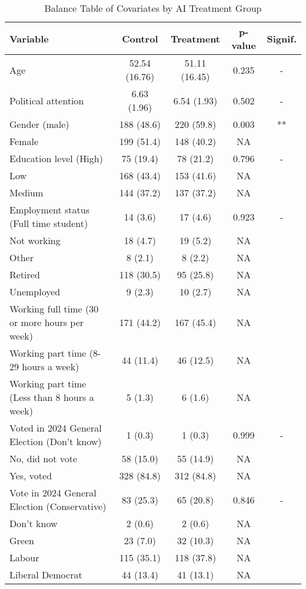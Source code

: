 \begin{table}
\centering
\caption{Balance Table of Covariates by AI Treatment Group}
\centering
\fontsize{10}{12}\selectfont
\begin{threeparttable}
\begin{tabular}[t]{lcccc}
\toprule
Variable & Control & Treatment & p-value & Signif.\\
\midrule
Age & 52.54 (16.76) & 51.11 (16.45) & 0.235 & -\\
Political attention & 6.63 (1.96) & 6.54 (1.93) & 0.502 & -\\
Gender (male) & 188 (48.6) & 220 (59.8) & 0.003 & **\\
Female & 199 (51.4) & 148 (40.2) & NA & \\
Education level (High) & 75 (19.4) & 78 (21.2) & 0.796 & -\\
\addlinespace
Low & 168 (43.4) & 153 (41.6) & NA & \\
Medium & 144 (37.2) & 137 (37.2) & NA & \\
Employment status (Full time student) & 14 (3.6) & 17 (4.6) & 0.923 & -\\
Not working & 18 (4.7) & 19 (5.2) & NA & \\
Other & 8 (2.1) & 8 (2.2) & NA & \\
\addlinespace
Retired & 118 (30.5) & 95 (25.8) & NA & \\
Unemployed & 9 (2.3) & 10 (2.7) & NA & \\
Working full time (30 or more hours per week) & 171 (44.2) & 167 (45.4) & NA & \\
Working part time (8-29 hours a week) & 44 (11.4) & 46 (12.5) & NA & \\
Working part time (Less than 8 hours a week) & 5 (1.3) & 6 (1.6) & NA & \\
\addlinespace
Voted in 2024 General Election (Don't know) & 1 (0.3) & 1 (0.3) & 0.999 & -\\
No, did not vote & 58 (15.0) & 55 (14.9) & NA & \\
Yes, voted & 328 (84.8) & 312 (84.8) & NA & \\
Vote in 2024 General Election (Conservative) & 83 (25.3) & 65 (20.8) & 0.846 & -\\
Don't know & 2 (0.6) & 2 (0.6) & NA & \\
\addlinespace
Green & 23 (7.0) & 32 (10.3) & NA & \\
Labour & 115 (35.1) & 118 (37.8) & NA & \\
Liberal Democrat & 44 (13.4) & 41 (13.1) & NA & \\

\end{tabular}
\end{threeparttable}
\end{table}
